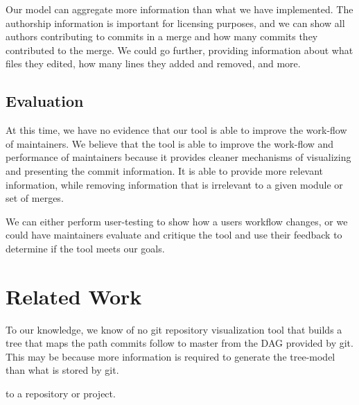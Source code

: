 \documentclass[conference, draftclsnofoot, draft]{IEEEtran}
\begin{document}
Our model can aggregate more information than what we have implemented. The
authorship information is important for licensing purposes, and we can show all
authors contributing to commits in a  merge and how many commits they contributed to
the merge. We could go further, providing information about what files they edited,
how many lines they added and removed, and more.

\subsection{Evaluation}

At this time, we have no evidence that our tool is able to improve the work-flow of
maintainers. We believe that the tool is able to improve the work-flow and
performance of maintainers because it provides cleaner mechanisms of visualizing and
presenting the commit information. It is able to provide more relevant information,
while removing information that is irrelevant to a given module or set of merges.

We can either perform user-testing to show how a users workflow changes, or we could
have maintainers evaluate and critique the tool and use their feedback to determine
if the tool meets our goals.

\section{Related Work}




To our knowledge, we know of no git repository visualization tool that builds
a tree that maps the path commits follow to master
from the DAG provided by git. This may be because more information is required
to generate the tree-model than what is stored by git. %

to a repository or project.
\end{document}
